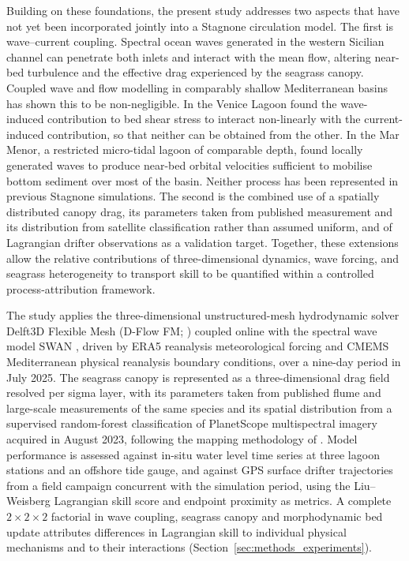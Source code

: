 Building on these foundations, the present study addresses two aspects that
have not yet been incorporated jointly into a Stagnone circulation model. The
first is wave--current coupling. Spectral ocean waves generated in the western
Sicilian channel can penetrate both inlets and interact with the mean flow,
altering near-bed turbulence and the effective drag experienced by the
seagrass canopy. Coupled wave and flow modelling in comparably shallow
Mediterranean basins has shown this to be non-negligible. In the Venice Lagoon
\citet{Carniello2011} found the wave-induced contribution to bed shear stress
to interact non-linearly with the current-induced contribution, so that neither
can be obtained from the other. In the Mar Menor, a restricted micro-tidal
lagoon of comparable depth, \citet{Morote2025} found locally generated waves to
produce near-bed orbital velocities sufficient to mobilise bottom sediment over
most of the basin. Neither process has been represented in previous Stagnone
simulations. The second is the combined use of a spatially distributed canopy
drag, its parameters taken from published measurement and its distribution from
satellite classification rather than assumed uniform, and of Lagrangian drifter
observations as a validation target. Together, these extensions allow the
relative contributions of three-dimensional dynamics, wave forcing, and
seagrass heterogeneity to transport skill to be quantified within a controlled
process-attribution framework.

The study applies the three-dimensional unstructured-mesh hydrodynamic solver Delft3D
Flexible Mesh (D-Flow FM; \citealp{Kernkamp2011}) coupled online with the
spectral wave model SWAN \citep{Booij1999}, driven by ERA5 reanalysis
meteorological forcing and CMEMS Mediterranean physical reanalysis boundary
conditions, over a nine-day period in July 2025. The seagrass canopy is
represented as a three-dimensional drag field resolved per sigma layer, with
its parameters taken from published flume and large-scale measurements of the
same species and its spatial distribution from a supervised random-forest
classification of PlanetScope multispectral imagery acquired in August 2023,
following the mapping methodology of \citet{Maltese2025}. Model performance is assessed against in-situ water level
time series at three lagoon stations and an offshore tide gauge, and against
GPS surface drifter trajectories from a field campaign concurrent with the
simulation period, using the Liu--Weisberg Lagrangian skill score and endpoint
proximity as metrics. A complete $2\times2\times2$ factorial in wave coupling,
seagrass canopy and morphodynamic bed update attributes differences in
Lagrangian skill to individual physical mechanisms and to their interactions
(Section~\ref{sec:methods_experiments}).

